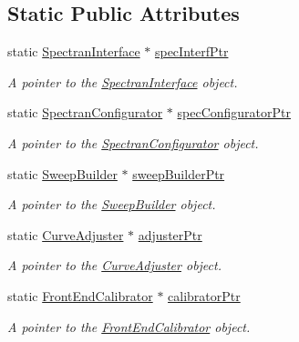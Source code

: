 \subsection*{Static Public Attributes}
\begin{DoxyCompactItemize}
\item 
static \hyperlink{classSpectranInterface}{Spectran\+Interface} $\ast$ \hyperlink{classSignalHandler_a855d0b79fcbacf50e4a1d12bd5d1bf53}{spec\+Interf\+Ptr}
\begin{DoxyCompactList}\small\item\em A pointer to the {\itshape \hyperlink{classSpectranInterface}{Spectran\+Interface}} object. \end{DoxyCompactList}\item 
static \hyperlink{classSpectranConfigurator}{Spectran\+Configurator} $\ast$ \hyperlink{classSignalHandler_a0b9c75b3e3c928c01cc5e44d42e5ac38}{spec\+Configurator\+Ptr}
\begin{DoxyCompactList}\small\item\em A pointer to the {\itshape \hyperlink{classSpectranConfigurator}{Spectran\+Configurator}} object. \end{DoxyCompactList}\item 
static \hyperlink{classSweepBuilder}{Sweep\+Builder} $\ast$ \hyperlink{classSignalHandler_a23ec28699521fb435a5eb90f2c36bccb}{sweep\+Builder\+Ptr}
\begin{DoxyCompactList}\small\item\em A pointer to the {\itshape \hyperlink{classSweepBuilder}{Sweep\+Builder}} object. \end{DoxyCompactList}\item 
static \hyperlink{classCurveAdjuster}{Curve\+Adjuster} $\ast$ \hyperlink{classSignalHandler_ab3328bb82a0e67153d8ff39bf04c7196}{adjuster\+Ptr}
\begin{DoxyCompactList}\small\item\em A pointer to the {\itshape \hyperlink{classCurveAdjuster}{Curve\+Adjuster}} object. \end{DoxyCompactList}\item 
static \hyperlink{classFrontEndCalibrator}{Front\+End\+Calibrator} $\ast$ \hyperlink{classSignalHandler_ae5bbe309adfefeb3b7e9ebf31d32b763}{calibrator\+Ptr}
\begin{DoxyCompactList}\small\item\em A pointer to the {\itshape \hyperlink{classFrontEndCalibrator}{Front\+End\+Calibrator}} object. \end{DoxyCompactList}\item 

\end{DoxyCompactItemize}
